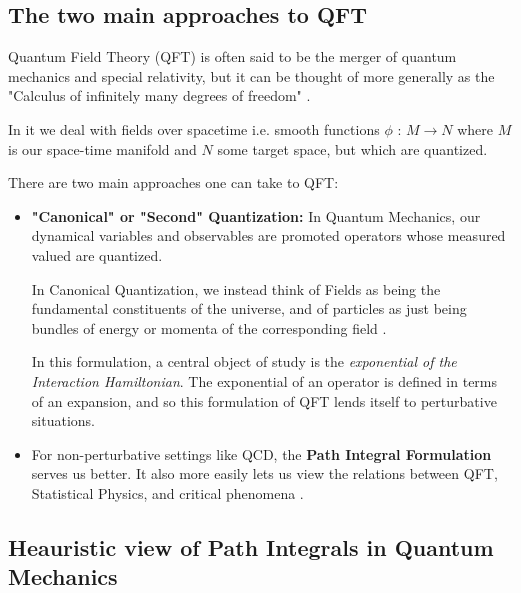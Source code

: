 \documentclass[11pt]{article}
\begin{document}
\vskip 0.5cm
\subsection{The two main approaches to QFT}
Quantum Field Theory (QFT) is often said to be the merger of quantum mechanics and special relativity, but it can be thought of more generally as the "Calculus of infinitely many degrees of freedom" \cite{232AdiscussionNotes}. 

\vskip 0.5cm
In it we deal with fields over spacetime i.e. smooth functions $\phi \text{ : } M \rightarrow N$ where $M$ is our space-time manifold and $N$ some target space, but which are quantized.

\vskip 0.5cm
There are two main approaches one can take to QFT:

\begin{itemize}
    \item \textbf{"Canonical" or "Second" Quantization:} In Quantum Mechanics, our dynamical variables and observables are promoted operators whose measured valued are quantized. 
    

    In Canonical Quantization, we instead think of Fields as being the fundamental constituents of the universe, and of particles as just being bundles of energy or momenta of the corresponding field \cite{Weinberg97}.
    
    In this formulation, a central object of study is the \emph{exponential of the Interaction Hamiltonian}. The exponential of an operator is defined in terms of an expansion, and so this formulation of QFT lends itself to perturbative situations. 
    
    \item For non-perturbative settings like QCD, the \textbf{Path Integral Formulation} serves us better. It also more easily lets us view the relations between QFT, Statistical Physics, and critical phenomena \cite{Maggiore05}.
\end{itemize}



\vskip 0.5cm
\subsection{Heauristic view of Path Integrals in Quantum Mechanics}
\end{document}
